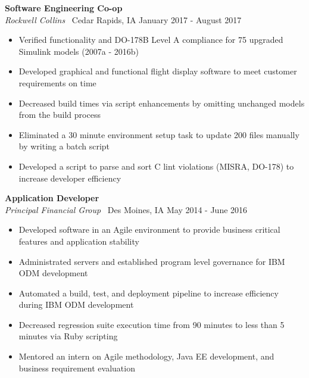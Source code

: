 \documentclass[overlapped, 11pt]{res}
\begin{document}
\begin{resume}
\begin{itemize}
        \vspace{0.5em}
        \textbf{Software Engineering Co-op}\\
        \emph{Rockwell Collins} \textbar 
            \ Cedar Rapids, IA \hfill January 2017 - August 2017
        \begin{itemize}
            \item Verified functionality and DO-178B Level A compliance for
                75 upgraded Simulink models (2007a - 2016b)
            \item Developed graphical and functional flight display 
                software to meet customer requirements on time
            \item Decreased build times via script enhancements by omitting
                unchanged models from the build process
            \item Eliminated a 30 minute environment setup task to update 
                200 files manually by writing a batch script
            \item Developed a script to parse and sort C lint violations 
                (MISRA, DO-178) to increase developer efficiency
        \end{itemize}

        \vspace{0.5em}
        \textbf{Application Developer}\\
        \emph{Principal Financial Group} \textbar 
            \ Des Moines, IA \hfill May 2014 - June 2016
        \begin{itemize}
            \item Developed software in an Agile environment to provide 
            business critical features and application stability
            \item Administrated servers and established program level 
            governance for IBM ODM development
            \item Automated a build, test, and deployment pipeline to increase 
            efficiency during IBM ODM development
            \item Decreased regression suite execution time from 90 minutes to 
            less than 5 minutes via Ruby scripting
            \item Mentored an intern on Agile methodology, Java EE development,
            and business requirement evaluation
        \end{itemize}


\end{itemize}
\end{resume}
\end{document}
